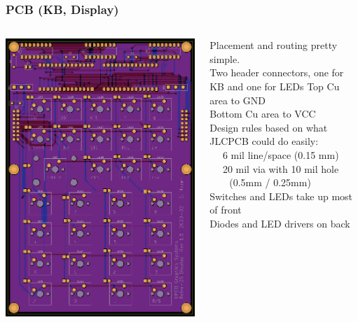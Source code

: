 \documentclass{beamer}
\newcommand{\tred}[1]{\textcolor{my-red}{#1}}
\newcommand{\tgreen}[1]{\textcolor{my-green}{#1}}
\newcommand{\tblue}[1]{\textcolor{my-blue}{#1}}
\newcommand{\tviolet}[1]{\textcolor{my-violet}{#1}}
\begin{document}
\begin{frame}
  \frametitle{PCB (KB, Display)}

  \vskip -0.2in
  \scriptsize
  \begin{columns}
    \includegraphics[width=\textwidth]{figs/led-gerbers.png}        
  
    Placement and routing pretty simple. \\
    Two header connectors, one for KB and one for LEDs
    \vskip 0.2in
    \tviolet{Top Cu area to GND} \\
    \tred{Bottom Cu area to VCC} \\
    \vskip 0.2in
    Design rules based on what JLCPCB could do easily: \\
    \tgreen{
    ~~ 6 mil line/space (0.15 mm)\\
    ~~ 20 mil via with 10 mil hole \\ ~~~~(0.5mm / 0.25mm)} \\
    \vskip 0.2in
    \tblue{Switches and LEDs take up most of front} \\
    \vskip 0.2in
    \tred{Diodes and LED drivers on back} \\
\end{columns}
\end{frame}
\end{document}
